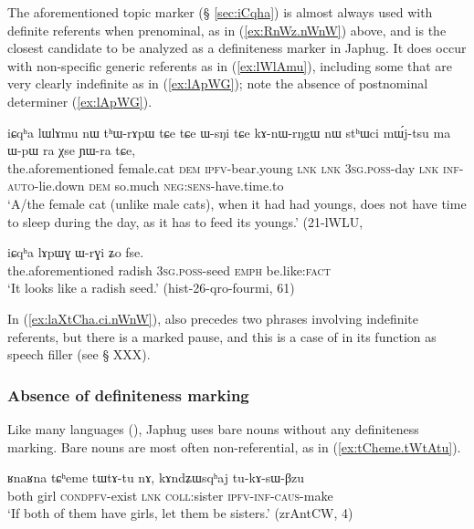 The aforementioned topic marker  (§ \ref{sec:iCqha}) is almost always used with definite referents when prenominal, as in (\ref{ex:RnWz.nWnW}) above, and is the closest candidate to be analyzed as a definiteness marker in Japhug. It does occur with non-specific generic referents as in (\ref{ex:lWlAmu}), including some that are very clearly indefinite as in (\ref{ex:lApWG}); note the absence of postnominal determiner  (\ref{ex:lApWG}).

\begin{exe}
\ex \label{ex:lWlAmu}
 \gll iɕqʰa lɯlɤmu nɯ tʰɯ-rɤpɯ tɕe tɕe ɯ-sŋi tɕe kɤ-nɯ-rŋgɯ nɯ stʰɯci mɯ́j-tsu ma ɯ-pɯ ra χse ɲɯ-ra tɕe, \\
 the.aforementioned female.cat \textsc{dem} \textsc{ipfv}-bear.young \textsc{lnk} \textsc{lnk} \textsc{3sg}.\textsc{poss}-day \textsc{lnk} \textsc{inf}-\textsc{auto}-lie.down \textsc{dem} so.much \textsc{neg}:\textsc{sens}-have.time.to \\
 \glt `A/the female cat (unlike male cats), when it had had youngs, does not have time to sleep during the day, as it has to feed its youngs.' (21-lWLU, 
\end{exe}

\begin{exe}
\ex \label{ex:lApWG}
\gll  iɕqʰa lɤpɯɣ ɯ-rɣi ʑo fse. \\
the.aforementioned radish \textsc{3sg}.\textsc{poss}-seed \textsc{emph} be.like:\textsc{fact} \\
\glt `It looks like a radish seed.' (hist-26-qro-fourmi, 61)
\end{exe}

In  (\ref{ex:laXtCha.ci.nWnW}),   also precedes two phrases involving indefinite referents, but  there is a marked pause, and this is a case of  in its function as speech filler (see § XXX).

\subsubsection{Absence of definiteness marking}
Like many languages (\citealt[130]{creissels06sgit1}), Japhug uses bare nouns without any definiteness marking. Bare nouns are most often non-referential, as  in (\ref{ex:tCheme.tWtAtu}).

\begin{exe}
\ex \label{ex:tCheme.tWtAtu}
\gll ʁnaʁna tɕʰeme tɯ\redp{}tɤ-tu nɤ, kɤndʑɯsqʰaj tu-kɤ-sɯ-βzu \\
both girl \textsc{cond}\redp{}\textsc{pfv}-exist \textsc{lnk} \textsc{coll}:sister \textsc{ipfv}-\textsc{inf}-\textsc{caus}-make \\
\glt `If both of them have girls, let them be sisters.' (zrAntCW, 4)
\end{exe}

